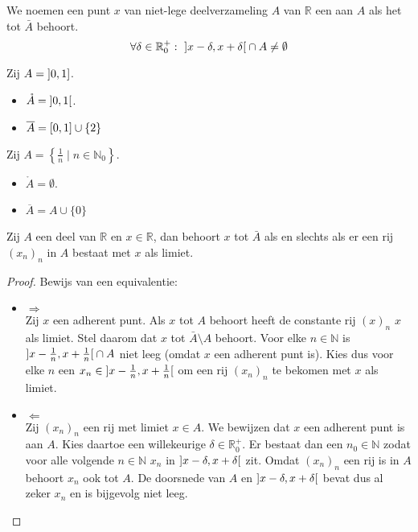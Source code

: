 \documentclass[main.tex]{subfiles}
\begin{document}
\begin{de}
  We noemen een punt $x$ van niet-lege deelverzameling $A$ van $\mathbb{R}$ een  aan $A$ als het tot $\bar{A}$ behoort.
  \[ \forall \delta \in \mathbb{R}_{0}^{+}:\ \interval[open]{x-\delta}{x+\delta} \cap A \neq \emptyset \]
\end{de}

\begin{vb}
  Zij $A= \interval[open left]{0}{1}$.
  \begin{itemize}
  \item $\mathring{A} = \interval[open]{0}{1}$.
  \item $\overline{A} = \interval{0}{1} \cup \{2\}$
  \end{itemize}
\end{vb}

\begin{vb}
  Zij $A= \left\{ \frac{1}{n} \mid n\in \mathbb{N}_{0} \right\}$.
  \begin{itemize}
  \item $\mathring{A} = \emptyset$.
  \item $\overline{A} = A \cup \{ 0 \}$
  \end{itemize}
\end{vb}


\begin{bpr}
  Zij $A$ een deel van $\mathbb{R}$ en $x\in \mathbb{R}$, dan behoort $x$ tot $\bar{A}$ als en slechts als er een rij $(x_{n})_{n}$ in $A$ bestaat met $x$ als limiet.

  \begin{proof}
    Bewijs van een equivalentie:
    \begin{itemize}
    \item $\Rightarrow$\\
      Zij $x$ een adherent punt.
      Als $x$ tot $A$ behoort heeft de constante rij $(x)_{n}$ $x$ als limiet.
      Stel daarom dat $x$ tot $\bar{A}\setminus A$ behoort.
      Voor elke $n\in \mathbb{N}$ is $\interval[open]{x-\frac{1}{n}}{x+\frac{1}{n}} \cap A$ niet leeg (omdat $x$ een adherent punt is).
      Kies dus voor elke $n$ een $x_{n} \in \interval[open]{x-\frac{1}{n}}{x+\frac{1}{n}}$ om een rij $(x_{n})_{n}$ te bekomen met $x$ als limiet.
    \item $\Leftarrow$\\
      Zij $(x_{n})_{n}$ een rij met limiet $x\in A$. We bewijzen dat $x$ een adherent punt is aan $A$.
      Kies daartoe een willekeurige $\delta \in \mathbb{R}_{0}^{+}$.
      Er bestaat dan een $n_{0}\in \mathbb{N}$ zodat voor alle volgende $n\in\mathbb{N}$ $x_{n}$ in $\interval[open]{x-\delta}{x+\delta}$ zit.
      Omdat $(x_{n})_{n}$ een rij is in $A$ behoort $x_{n}$ ook tot $A$.
      De doorsnede van $A$ en $\interval[open]{x-\delta}{x+\delta}$ bevat dus al zeker $x_{n}$ en is bijgevolg niet leeg.
    \end{itemize}
  \end{proof}
\end{bpr}
\end{document}
